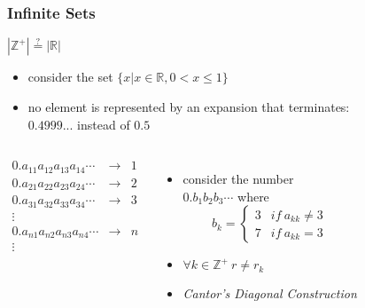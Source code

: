 \documentclass[dvipsnames]{beamer}
\begin{document}
\begin{frame}
  \frametitle{Infinite Sets}

  \begin{block}{$|\mathbb{Z}^+| \stackrel{?}{=} |\mathbb{R}|$}
    \begin{itemize}
      \item consider the set $\{x | x \in \mathbb{R}, 0 < x \leq 1\}$
      \item no element is represented by an expansion that terminates:\\
        $0.4999...$ instead of $0.5$
    \end{itemize}

    \vspace{-2em}
    \begin{columns}[t]
      \[
      \begin{array}{lcl}
        0.a_{11}a_{12}a_{13}a_{14}\cdots & \rightarrow & 1\\
        0.a_{21}a_{22}a_{23}a_{24}\cdots & \rightarrow & 2\\
        0.a_{31}a_{32}a_{33}a_{34}\cdots & \rightarrow & 3\\
        \vdots                           &             &\\
        0.a_{n1}a_{n2}a_{n3}a_{n4}\cdots & \rightarrow & n\\
        \vdots                           &             &
      \end{array}
      \]

      \pause
      \begin{itemize}
        \item consider the number\\
          $0.b_1b_2b_3\cdots$ where
        \begin{equation*}
          b_k = \left\{
            \begin{array}{ll}
              3 & if~a_{kk} \neq 3\\
              7 & if~a_{kk} = 3
            \end{array}\right.
        \end{equation*}

        \pause
        \item $\forall k \in \mathbb{Z}^+~r \neq r_k$
        \item \emph{Cantor's Diagonal Construction}
      \end{itemize}
    \end{columns}
  \end{block}
\end{frame}
\end{document}
